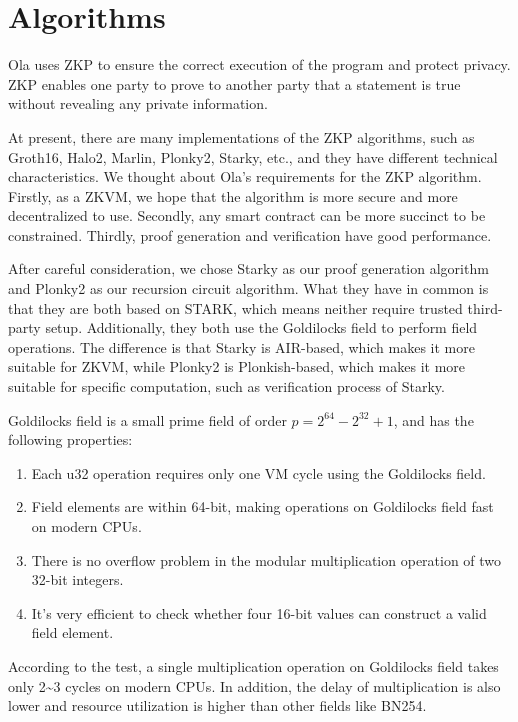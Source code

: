 \section{Algorithms} \label{sec:algorithms}
Ola uses ZKP to ensure the correct execution of the program and protect privacy. ZKP enables one party to prove to another party that a statement is true without revealing any private information.

At present, there are many implementations of the ZKP algorithms, such as Groth16, Halo2, Marlin, Plonky2, Starky, etc., and they have different technical characteristics. We thought about Ola's requirements for the ZKP algorithm. Firstly, as a ZKVM, we hope that the algorithm is more secure and more decentralized to use. Secondly, any smart contract can be more succinct to be constrained. Thirdly, proof generation and verification have good performance.

After careful consideration, we chose Starky as our proof generation algorithm and Plonky2 as our recursion circuit algorithm. What they have in common is that they are both based on STARK, which means neither require trusted third-party setup. Additionally, they both use the Goldilocks field to perform field operations. The difference is that Starky is AIR-based, which makes it more suitable for ZKVM, while Plonky2 is Plonkish-based, which makes it more suitable for specific computation, such as verification process of Starky.

Goldilocks field is a small prime field of order $p = 2^{64} - 2^{32} + 1$, and has the following properties:

\begin{enumerate}
    \item Each u32 operation requires only one VM cycle using the Goldilocks field.
    \item Field elements are within 64-bit, making operations on Goldilocks field fast on modern CPUs.
    \item There is no overflow problem in the modular multiplication operation of two 32-bit integers.
    \item It's very efficient to check whether four 16-bit values can construct a valid field element.
\end{enumerate}

According to the test, a single multiplication operation on Goldilocks field takes only 2\textasciitilde3 cycles on modern CPUs. In addition, the delay of multiplication is also lower and resource utilization is higher than other fields like BN254.








